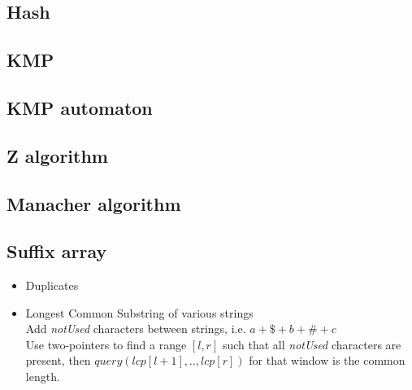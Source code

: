 
\subsection{Hash }

\subsection{KMP } 
\vspace{-15pt}

\subsection{KMP automaton }

\subsection{Z algorithm }

\subsection{Manacher algorithm }

\subsection{Suffix array }
\vspace{-5pt}
\begin{itemize}[noitemsep]
  \item Duplicates 

  \item Longest Common Substring of various strings \\
  Add \emph{notUsed} characters between strings, i.e. $a + \$ + b + \# + c$ \\ 
  Use two-pointers to find a range $[l, r]$ such that all \emph{notUsed} characters are present, then $query(lcp[l + 1],..,lcp[r])$ for that window is the common length. \\


\end{itemize}
\vspace{-15pt}

